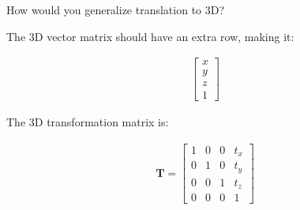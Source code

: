 How would you generalize translation to 3D?

\begin{solution}
    The 3D vector matrix should have an extra row, making it:
    
    \begin{align*}
        \begin{bmatrix}
            x \\ y \\ z \\ 1
        \end{bmatrix}
    \end{align*}
    
    The 3D transformation matrix is:
    
    \begin{align*}
        \boldsymbol{T} = \begin{bmatrix}
            1 & 0 & 0 & t_x \\
            0 & 1 & 0 & t_y \\
            0 & 0 & 1 & t_z \\
            0 & 0 & 0 & 1
        \end{bmatrix}
    \end{align*}
\end{solution}